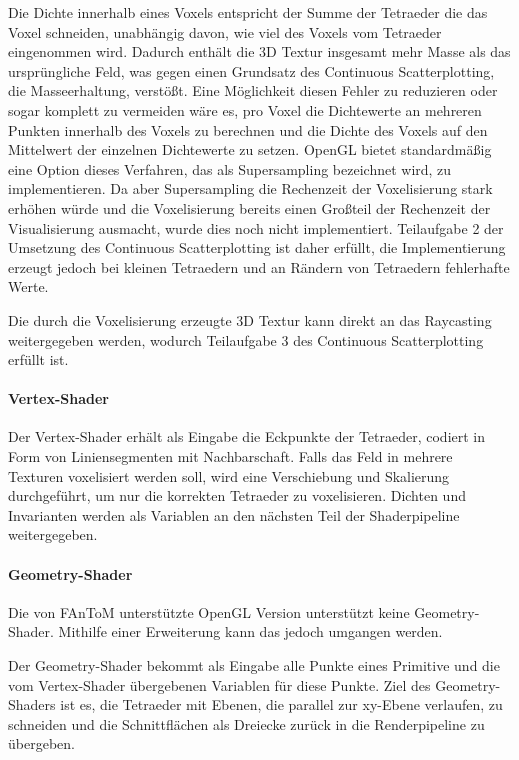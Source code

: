 \documentclass[a4paper,fontsize=12pt,toc=bib,parskip=half,ngerman]{scrartcl}
\begin{document}
Die Dichte innerhalb eines Voxels entspricht der Summe der Tetraeder die das Voxel schneiden, unabh\"angig davon, wie viel des Voxels vom Tetraeder eingenommen wird. Dadurch enth\"alt die 3D Textur insgesamt mehr Masse als das urspr\"ungliche Feld, was gegen einen Grundsatz des Continuous Scatterplotting, die Masseerhaltung, verst\"o{\ss}t. Eine M\"oglichkeit diesen Fehler zu reduzieren oder sogar komplett zu vermeiden w\"are es, pro Voxel die Dichtewerte an mehreren Punkten innerhalb des Voxels zu berechnen und die Dichte des Voxels auf den Mittelwert der einzelnen Dichtewerte zu setzen. OpenGL bietet standardm\"a{\ss}ig eine Option dieses Verfahren, das als Supersampling bezeichnet wird, zu implementieren. Da aber Supersampling die Rechenzeit der Voxelisierung stark erh\"ohen w\"urde und die Voxelisierung bereits einen Gro{\ss}teil der Rechenzeit der Visualisierung ausmacht, wurde dies noch nicht implementiert. Teilaufgabe 2 der Umsetzung des Continuous Scatterplotting ist daher erf\"ullt, die Implementierung erzeugt jedoch bei kleinen Tetraedern und an R\"andern von Tetraedern fehlerhafte Werte.

Die durch die Voxelisierung erzeugte 3D Textur kann direkt an das Raycasting weitergegeben werden, wodurch Teilaufgabe 3 des Continuous Scatterplotting erf\"ullt ist.

\paragraph{Vertex-Shader}
Der Vertex-Shader erh\"alt als Eingabe die Eckpunkte der Tetraeder, codiert in Form von Liniensegmenten mit Nachbarschaft. Falls das Feld in mehrere Texturen voxelisiert werden soll, wird eine Verschiebung und Skalierung durchgef\"uhrt, um nur die korrekten Tetraeder zu voxelisieren. Dichten und Invarianten werden als Variablen an den n\"achsten Teil der Shaderpipeline weitergegeben.

\paragraph{Geometry-Shader}
Die von FAnToM unterst\"utzte OpenGL Version unterst\"utzt keine Geometry-Shader. Mithilfe einer Erweiterung kann das jedoch umgangen werden.

Der Geometry-Shader bekommt als Eingabe alle Punkte eines Primitive und die vom Vertex-Shader \"ubergebenen Variablen f\"ur diese Punkte. Ziel des Geometry-Shaders ist es, die Tetraeder mit Ebenen, die parallel zur xy-Ebene verlaufen, zu schneiden und die Schnittfl\"achen als Dreiecke zur\"uck in die Renderpipeline zu \"ubergeben.
\end{document}
